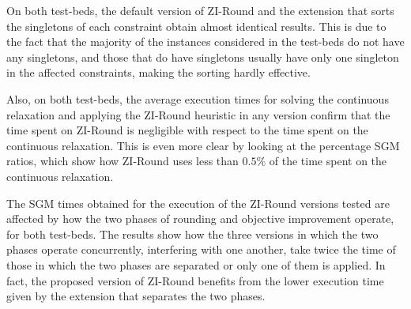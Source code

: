 \documentclass[a4paper,12pt]{book}
\begin{document}
On both test-beds, the default version of ZI-Round and the extension that sorts the singletons of each constraint obtain almost identical results. This is due to the fact that the majority of the instances considered in the test-beds do not have any singletons, and those that do have singletons usually have only one singleton in the affected constraints, making the sorting hardly effective. \par 

Also, on both test-beds, the average execution times for solving the continuous relaxation and applying the ZI-Round heuristic in any version confirm that the time spent on ZI-Round is negligible with respect to the time spent on the continuous relaxation. This is even more clear by looking at the percentage SGM ratios, which show how ZI-Round uses less than $0.5\%$ of the time spent on the continuous relaxation. \par

The SGM times obtained for the execution of the ZI-Round versions tested are affected by how the two phases of rounding and objective improvement operate, for both test-beds. The results show how the three versions in which the two phases operate concurrently, interfering with one another, take twice the time of those in which the two phases are separated or only one of them is applied.
In fact, the proposed version of ZI-Round benefits from the lower execution time given by the extension that separates the two phases. \par
\end{document}
